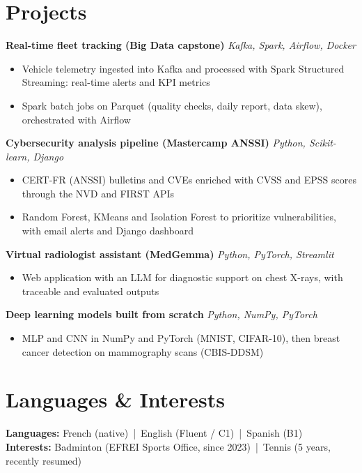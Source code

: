 \documentclass[10pt,a4paper]{article}
\newcommand{\secgap}{\vspace{3.5pt plus 1.5pt minus 1pt}}
\newcommand{\itemgap}{\vspace{2pt plus 1pt minus 0.5pt}}
\begin{document}
\secgap
\section{Projects}

\textbf{Real-time fleet tracking (Big Data capstone)} \hfill \textit{Kafka, Spark, Airflow, Docker}
\begin{itemize}
  \item Vehicle telemetry ingested into Kafka and processed with Spark Structured Streaming: real-time alerts and KPI metrics
  \item Spark batch jobs on Parquet (quality checks, daily report, data skew), orchestrated with Airflow
\end{itemize}

\itemgap
\textbf{Cybersecurity analysis pipeline (Mastercamp ANSSI)} \hfill \textit{Python, Scikit-learn, Django}
\begin{itemize}
  \item CERT-FR (ANSSI) bulletins and CVEs enriched with CVSS and EPSS scores through the NVD and FIRST APIs
  \item Random Forest, KMeans and Isolation Forest to prioritize vulnerabilities, with email alerts and Django dashboard
\end{itemize}

\itemgap
\textbf{Virtual radiologist assistant (MedGemma)} \hfill \textit{Python, PyTorch, Streamlit}
\begin{itemize}
  \item Web application with an LLM for diagnostic support on chest X-rays, with traceable and evaluated outputs
\end{itemize}

\itemgap
\textbf{Deep learning models built from scratch} \hfill \textit{Python, NumPy, PyTorch}
\begin{itemize}
  \item MLP and CNN in NumPy and PyTorch (MNIST, CIFAR-10), then breast cancer detection on mammography scans (CBIS-DDSM)
\end{itemize}

\secgap
\section{Languages \& Interests}
\textbf{Languages:} French (native) \,|\, English (Fluent / C1) \,|\, Spanish (B1)\\[1.5pt]
\textbf{Interests:} Badminton (EFREI Sports Office, since 2023) \,|\, Tennis (5 years, recently resumed)
\end{document}
